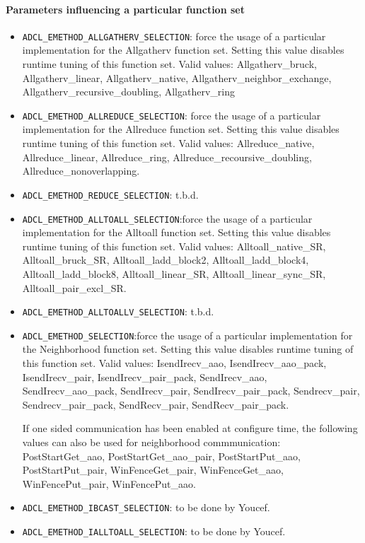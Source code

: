 \paragraph{Parameters influencing a particular function set}
\begin{itemize}
\item{\tt ADCL\_EMETHOD\_ALLGATHERV\_SELECTION}: force the usage of a particular
  implementation for the Allgatherv function set. Setting this value
  disables runtime tuning of this function set. Valid values: Allgatherv\_bruck, Allgatherv\_linear,
  Allgatherv\_native, Allgatherv\_neighbor\_exchange,
  Allgatherv\_recursive\_doubling, Allgatherv\_ring

\item{\tt ADCL\_EMETHOD\_ALLREDUCE\_SELECTION}: force the usage of a
  particular implementation for the Allreduce function set. Setting this value
  disables runtime tuning of this function set. Valid values:
  Allreduce\_native, Allreduce\_linear, Allreduce\_ring,
  Allreduce\_recoursive\_doubling, Allreduce\_nonoverlapping.

\item{\tt ADCL\_EMETHOD\_REDUCE\_SELECTION}: t.b.d.

\item{\tt ADCL\_EMETHOD\_ALLTOALL\_SELECTION}:force the usage of a
  particular implementation for the Alltoall function set. Setting this value
  disables runtime tuning of this function set. Valid values:
  Alltoall\_native\_SR, Alltoall\_bruck\_SR, Alltoall\_ladd\_block2,
  Alltoall\_ladd\_block4, Alltoall\_ladd\_block8, Alltoall\_linear\_SR,
  Alltoall\_linear\_sync\_SR, Alltoall\_pair\_excl\_SR.

\item{\tt ADCL\_EMETHOD\_ALLTOALLV\_SELECTION}: t.b.d.

\item {\tt ADCL\_EMETHOD\_SELECTION}:force the usage of a particular
  implementation for the Neighborhood function set. Setting this value
  disables runtime tuning of this function set. Valid values: IsendIrecv\_aao,
  IsendIrecv\_aao\_pack, IsendIrecv\_pair, IsendIrecv\_pair\_pack,
  SendIrecv\_aao, SendIrecv\_aao\_pack, SendIrecv\_pair, SendIrecv\_pair\_pack,
  Sendrecv\_pair, Sendrecv\_pair\_pack, SendRecv\_pair,
  SendRecv\_pair\_pack. 

  If one sided communication has been enabled at configure time, the following
  values can also be used for neighborhood commmunication: PostStartGet\_aao,
  PostStartGet\_aao\_pair, PostStartPut\_aao, PostStartPut\_pair,
  WinFenceGet\_pair, WinFenceGet\_aao, WinFencePut\_pair, WinFencePut\_aao.
 
\item{\tt ADCL\_EMETHOD\_IBCAST\_SELECTION}: to be done by Youcef.
\item{\tt ADCL\_EMETHOD\_IALLTOALL\_SELECTION}: to be done by Youcef.
\end{itemize}


